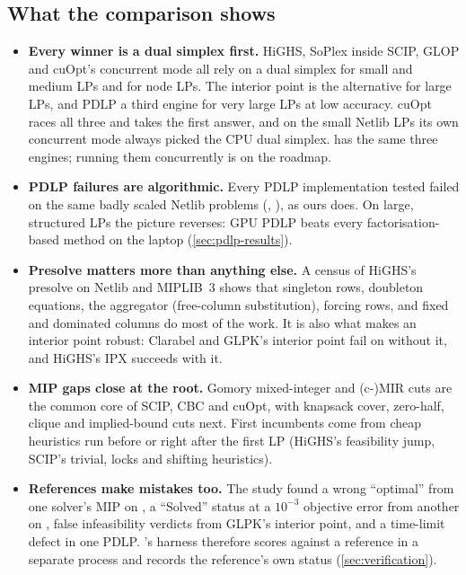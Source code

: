 \subsection{What the comparison shows}
\begin{itemize}
  \item \textbf{Every winner is a dual simplex first.} HiGHS, SoPlex inside SCIP, GLOP and cuOpt's
        concurrent mode all rely on a dual simplex for small and medium LPs and for node LPs. The
        interior point is the alternative for large LPs, and PDLP a third engine for very large LPs at
        low accuracy. cuOpt races all three and takes the first answer, and on the small Netlib LPs its
        own concurrent mode always picked the CPU dual simplex. \nirnay{} has the same three engines;
        running them concurrently is on the roadmap.
  \item \textbf{PDLP failures are algorithmic.} Every PDLP implementation tested failed on the same
        badly scaled Netlib problems (, ), as ours does. On large,
        structured LPs the picture reverses: GPU PDLP beats every factorisation-based method on the
        laptop (\cref{sec:pdlp-results}).
  \item \textbf{Presolve matters more than anything else.} A census of HiGHS's presolve on Netlib and
        MIPLIB~3 shows that singleton rows, doubleton equations, the aggregator (free-column
        substitution), forcing rows, and fixed and dominated columns do most of the work. It is also what
        makes an interior point robust: Clarabel and GLPK's interior point fail on 
        without it, and HiGHS's IPX succeeds with it.
  \item \textbf{MIP gaps close at the root.} Gomory mixed-integer and (c-)MIR cuts are the common core
        of SCIP, CBC and cuOpt, with knapsack cover, zero-half, clique and implied-bound cuts next. First
        incumbents come from cheap heuristics run before or right after the first LP (HiGHS's
        feasibility jump, SCIP's trivial, locks and shifting heuristics).
  \item \textbf{References make mistakes too.} The study found a wrong ``optimal'' from one solver's
        MIP on , a ``Solved'' status at a $10^{-3}$ objective error from another on
        , false infeasibility verdicts from GLPK's interior point, and a time-limit
        defect in one PDLP. \nirnay{}'s harness therefore scores against a reference in a separate
        process and records the reference's own status (\cref{sec:verification}).
\end{itemize}

